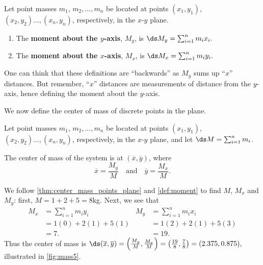 {Let point masses $m_1$, $m_2,\ldots,m_n$ be located at points $(x_1,y_1)$, $(x_2,y_2)\ldots,(x_n,y_n)$, respectively, in the $x$-$y$ plane. 
\begin{enumerate}
	\item The \textbf{moment about the $y$-axis}, $M_y$, is 
	$\ds M_y = \sum_{i=1}^n m_ix_i.$
	\item The \textbf{moment about the $x$-axis}, $M_x$, is 
	$\ds M_x = \sum_{i=1}^n m_iy_i.$
	\end{enumerate}
}

One can think that these definitions are ``backwards'' as $M_y$ sums up ``$x$'' distances. But remember, ``$x$'' distances are measurements of distance from the $y$-axis, hence defining the moment about the $y$-axis.

We now define the center of mass of discrete points in the plane.

{Let point masses $m_1$, $m_2,\ldots,m_n$ be located at points $(x_1,y_1)$, $(x_2,y_2)\ldots,(x_n,y_n)$, respectively, in the $x$-$y$ plane, and let $\ds M = \sum_{i=1}^n m_i$.  

The center of mass of the system is at $(\overline{x},\overline{y})$, where 
$$\overline{x}= \frac{M_y}{M}\quad \text{and}\quad \overline{y} = \frac{M_x}{M}.$$}

{We follow \autoref{thm:center_mass_points_plane} and \autoref{def:moment} to find $M$, $M_x$ and $M_y$: first, $M = 1+2+5 = 8$kg.  Next, we see that
\begin{align*}
M_x &=  \sum_{i=1}^n m_iy_i & M_y &=  \sum_{i=1}^n m_i x_i \\
		&= 1(0) + 2(1) + 5(1) & &= 1(2) + 2(1) + 5(3) \\
		&= 7. & &= 19.
\end{align*}
Thus the center of mass is $\ds (\overline{x},\overline{y}) = \left(\frac{M_y}{M},\frac{M_x}M\right) = \left(\frac{{19}}8,\frac78\right)  =(2.375,0.875),$ illustrated in \autoref{fig:mass5}.}

